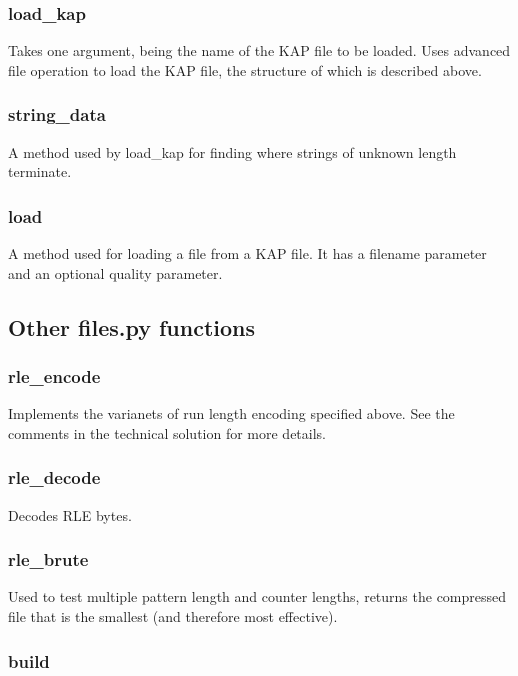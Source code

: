 \documentclass{report}
\begin{document}
\subsubsection{load\_kap}

Takes one argument, being the name of the KAP file to be loaded. Uses advanced file operation to load the KAP file, the structure of which is described above.

\subsubsection{string\_data}

A method used by load\_kap for finding where strings of unknown length terminate.

\subsubsection{load}

A method used for loading a file from a KAP file. It has a filename parameter and an optional quality parameter.

\subsection{Other files.py functions}

\subsubsection{rle\_encode}

Implements the varianets of run length encoding specified above. See the comments in the technical solution for more details.

\subsubsection{rle\_decode}

Decodes RLE bytes.

\subsubsection{rle\_brute}

Used to test multiple pattern length and counter lengths, returns the compressed file that is the smallest (and therefore most effective).

\subsubsection{build}
\end{document}
